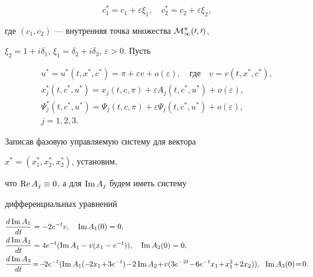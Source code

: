 \begin{equation}


c^*_1=c_1+\varepsilon\xi_1,\quad


c^*_2=c_2+\varepsilon\xi_2,


\end{equation}


где $(c_1,c_2)$ --- внутренняя точка множества $\cal M^\pi_1(0,0)$,


$\xi_2=1+i\delta_1$, $\xi_1=\delta_2+i\delta_3$, $\varepsilon>0$. Пусть


\begin{gather*}


u^*=u^*(t,x^*,c^*)=\pi+\varepsilon v+o(\varepsilon),\quad


\text{где}\quad


v=v(t,x^*,c^*), \\


x^*_j(t,c^*,u^*)=x_j(t,c,\pi)+\varepsilon A_j(t,c^*,u^*)+


o(\varepsilon), \\


\Psi^*_j(t,c^*,u^*)=\Psi_j(t,c,\pi)+


\varepsilon\Psi_j(t,c^*,u^*)+o(\varepsilon), \\


j=1,2,3.


\end{gather*}


Записав фазовую управляемую систему для вектора


$x^*=(x^*_1,x^*_2,x^*_2)$, установим,


что $\operatorname{Re} A_j\equiv 0$, а для $\operatorname{Im} A_j$ будем иметь систему


дифференциальных уравнений


\begin{align}


\frac{d\im A_1}{dt}&=-2e^{-t}v, \quad \im A_1(0)=0,\notag \\


\frac{d\im A_2}{dt}&=4e^{-t}(\im A_1-v(x_1-e^{-t})),


\quad \im A_2(0)=0, \\


\frac{d\im A_3}{dt}&\!=\!-\!2e^{-t}(\im A_1(-\!2x_1\!+\!3e^{-t})\!-\!


2\im A_2\!+\!v(3e^{-2t}\!-\!6e^{-t}x_1\!+\!x^2_1\!+\!2x_2)), \ \;


\im A_3(0)\!=\!0.\notag


\end{align}





